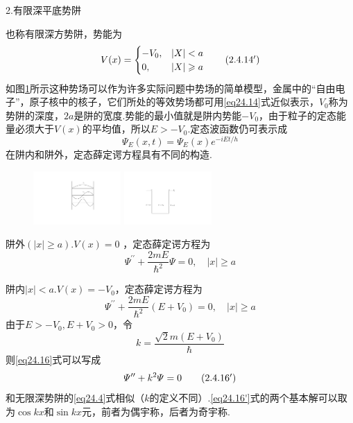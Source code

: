 {\heiti 2.有限深平底势阱}

也称有限深方势阱，势能为
\begin{equation}\label{eq24.14'}
	V(x)=
	\begin{cases} \notag
		-V_{0}, &|X|<a \\
		0,	 &|X|\geqslant a
	\end{cases} \tag{$2.4.14^{\prime}$}
\end{equation}
如图\ref{fig.2-4}所示这种势场可以作为许多实际问题中势场的简单模型，金属中的“自由电子”，原子核中的核子，它们所处的等效势场都可用\eqref{eq24.14}式近似表示，$V_{0}$称为势阱的深度，$2a$是阱的宽度.势能的最小值就是阱内势能$-V_{0}$，由于粒子的定态能量必须大于$V(x)$的平均值，所以$E>-V_{0}$.定态波函数仍可表示成
\begin{equation*}
	\varPsi_{E}(x,t)=\varPsi_{E}(x)e^{-iEt/h}
\end{equation*}
在阱内和阱外，定态薛定谔方程具有不同的构造.
\begin{figure}
	\centering
	\begin{minipage}[h!]{12em}
		\centering
		\includegraphics[width=9em]{QM file/figure/2-3}
		\caption{}\label{fig.2-3}
	\end{minipage}
	\begin{minipage}[h!]{12em}
		\centering
		\includegraphics[width=9em]{QM file/figure/2-4}
		\caption{}\label{fig.2-4}
	\end{minipage}
\end{figure}

阱外$(|x|\geqslant a)$.$V(x)=0$ ，定态薛定谔方程为
\begin{equation}\label{eq24.15}
	\varPsi^{\prime\prime}+\frac{2mE}{\hbar^{2}}\varPsi=0,\quad |x|\geqslant a
\end{equation}

阱内$|x|<a$.$V(x)=-V_{0}$，定态薛定谔方程为
\begin{equation}\label{eq24.16}
	\varPsi^{\prime\prime}+\frac{2mE}{\hbar^{2}}(E+V_{0})=0,\quad |x|\geqslant a
\end{equation}
由于$E>-V_{0},E+V_{0}>0$，令
\begin{equation}\label{eq24.17}
	k=\frac{\sqrt{2}m(E+V_{0})}{\hbar}
\end{equation}
则\eqref{eq24.16}式可以写成
\begin{equation*}\label{eq24.16'}
	\varPsi^{\prime\prime}+k^{2}\varPsi=0	\tag{$2.4.16^{\prime}$}
\end{equation*}
和无限深势阱的\eqref{eq24.4}式相似（$k$的定义不同）.\eqref{eq24.16'}式的两个基本解可以取为$\cos kx$和$\sin kx$元，前者为偶宇称，后者为奇宇称.


